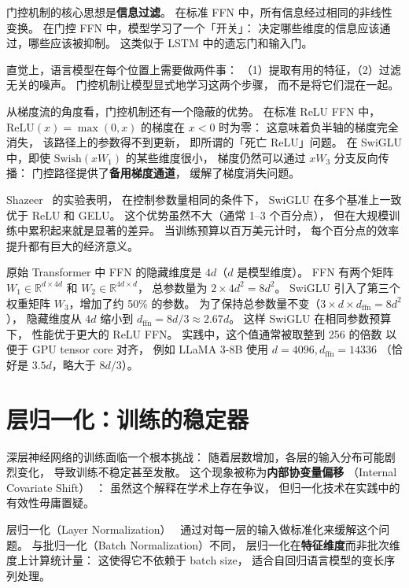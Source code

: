 门控机制的核心思想是\textbf{信息过滤}。
在标准 FFN 中，所有信息经过相同的非线性变换。
在门控 FFN 中，模型学习了一个「开关」：
决定哪些维度的信息应该通过，哪些应该被抑制。
这类似于 LSTM 中的遗忘门和输入门。

直觉上，语言模型在每个位置上需要做两件事：
（1）提取有用的特征，（2）过滤无关的噪声。
门控机制让模型显式地学习这两个步骤，
而不是将它们混在一起。

从梯度流的角度看，门控机制还有一个隐蔽的优势。
在标准 ReLU FFN 中，$\mathrm{ReLU}(x) = \max(0, x)$
的梯度在 $x < 0$ 时为零：
这意味着负半轴的梯度完全消失，
该路径上的参数得不到更新，
即所谓的「死亡 ReLU」问题。
在 SwiGLU 中，即使 $\mathrm{Swish}(xW_1)$ 的某些维度很小，
梯度仍然可以通过 $xW_3$ 分支反向传播：
门控路径提供了\textbf{备用梯度通道}，
缓解了梯度消失问题。

Shazeer~\cite{shazeer2020glu} 的实验表明，
在控制参数量相同的条件下，
SwiGLU 在多个基准上一致优于 ReLU 和 GELU。
这个优势虽然不大（通常 1--3 个百分点），
但在大规模训练中累积起来就是显著的差异。
当训练预算以百万美元计时，
每个百分点的效率提升都有巨大的经济意义。

\begin{whybox}
原始 Transformer 中 FFN 的隐藏维度是 $4d$（$d$ 是模型维度）。
FFN 有两个矩阵 $W_1 \in \mathbb{R}^{d \times 4d}$ 和 $W_2 \in \mathbb{R}^{4d \times d}$，
总参数量为 $2 \times 4d^2 = 8d^2$。
SwiGLU 引入了第三个权重矩阵 $W_3$，增加了约 50\% 的参数。
为了保持总参数量不变（$3 \times d \times d_{\mathrm{ffn}} = 8d^2$），
隐藏维度从 $4d$ 缩小到 $d_{\mathrm{ffn}} = 8d/3 \approx 2.67d$。
这样 SwiGLU 在相同参数预算下，
性能优于更大的 ReLU FFN。
实践中，这个值通常被取整到 256 的倍数
以便于 GPU tensor core 对齐，
例如 LLaMA 3-8B 使用 $d = 4096, d_{\mathrm{ffn}} = 14336$
（恰好是 $3.5d$，略大于 $8d/3$）。
\end{whybox}

\section{层归一化：训练的稳定器}

深层神经网络的训练面临一个根本挑战：
随着层数增加，各层的输入分布可能剧烈变化，
导致训练不稳定甚至发散。
这个现象被称为\textbf{内部协变量偏移}
（Internal Covariate Shift）~\cite{ioffe2015batchnorm}：
虽然这个解释在学术上存在争议，
但归一化技术在实践中的有效性毋庸置疑。

层归一化（Layer Normalization）~\cite{ba2016layernorm}
通过对每一层的输入做标准化来缓解这个问题。
与批归一化（Batch Normalization）不同，
层归一化在\textbf{特征维度}而非批次维度上计算统计量：
这使得它不依赖于 batch size，
适合自回归语言模型的变长序列处理。

